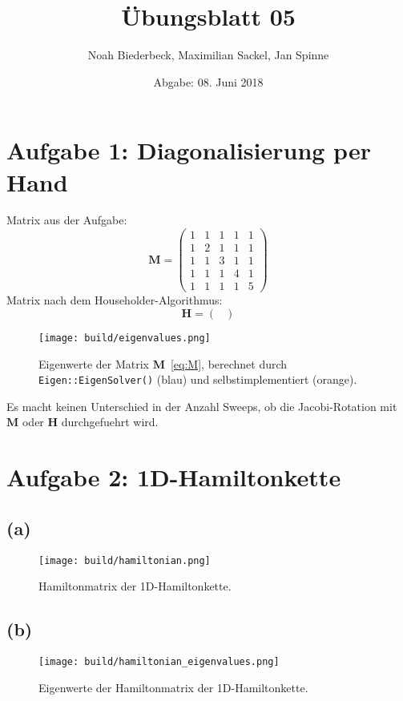 \documentclass{scrartcl}
\title{Übungsblatt 05}
\author{%
		Noah Biederbeck, Maximilian Sackel, Jan Spinne
}
\date{Abgabe: 08. Juni 2018}
\begin{document}
\maketitle

\section*{Aufgabe 1: Diagonalisierung per Hand}
Matrix aus der Aufgabe:
\begin{equation}
  \label{eq:M}
  \mathbf{M} = \left(\begin{matrix}
      1 & 1 & 1 & 1 & 1 \\
      1 & 2 & 1 & 1 & 1 \\
      1 & 1 & 3 & 1 & 1 \\
      1 & 1 & 1 & 4 & 1 \\
      1 & 1 & 1 & 1 & 5
  \end{matrix}\right)
\end{equation}
Matrix nach dem Householder-Algorithmus:
\begin{equation}
  \label{eq:H}
  \mathbf{H} = \left(\begin{matrix}
    
\end{matrix}\right)
\end{equation}
\begin{figure}[ht]
  \centering
  \texttt{[image: build/eigenvalues.png]}
  \caption{Eigenwerte der Matrix $\mathbf{M}$~\eqref{eq:M}, berechnet durch \texttt{Eigen::EigenSolver()} (blau) und selbstimplementiert (orange).}%
  \label{fig:eigenvalues}
\end{figure}
Es macht keinen Unterschied in der Anzahl Sweeps, ob die Jacobi-Rotation mit $\mathbf{M}$ oder $\mathbf{H}$ durchgefuehrt wird.

\section*{Aufgabe 2: 1D-Hamiltonkette}
\subsection*{(a)}
\begin{figure}[ht]
  \centering
  \texttt{[image: build/hamiltonian.png]}
  \caption{Hamiltonmatrix der 1D-Hamiltonkette.}%
  \label{fig:hamiltonkette}
\end{figure}

\subsection*{(b)}
\begin{figure}[ht]
  \centering
  \texttt{[image: build/hamiltonian\_eigenvalues.png]}
  \caption{Eigenwerte der Hamiltonmatrix der 1D-Hamiltonkette.}%
  \label{fig:hamiltonkette_eigenvalues}
\end{figure}
\end{document}
